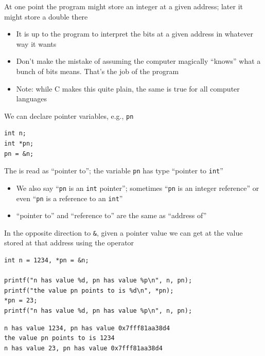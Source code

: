 \documentclass{beamer}
\def\code#1{{\ifmmode\else\large\fi\tt#1}}
\begin{document}
\begin{frame}
At one point the program might store an integer at a given address; later it
might store a double there
\begin{itemize}
\item{It is up to the program to interpret the bits at a given address
  in whatever way it wants}

\item{Don't make the mistake of assuming the computer magically
  ``knows'' what a bunch of bits means.  That's the job of the program}

\item{Note: while C makes this quite plain, the same is true for all
  computer languages}
\end{itemize}
\end{frame}

\begin{frame}[fragile]
We can declare pointer variables, e.g., \code{pn}

\begin{block}{}
\begin{lstlisting}
int n;
int *pn;
pn = &n;
\end{lstlisting}
\end{block}

The \code{*} is read as ``pointer to''; the variable \code{pn} has type
``pointer to \code{int}''
\begin{itemize}
\item{We also say ``\code{pn} is an \code{int} pointer''; sometimes
``\code{pn} is an integer reference'' or even ``\code{pn} is a reference to an
\code{int}''}

\item{``pointer to'' and ``reference to'' are the same as ``address of''}
\end{itemize}
\end{frame}

\begin{frame}[fragile]
In the opposite direction to \code{\&}, given a pointer value we can get at the
value stored at that address using the \code{*} operator
\begin{block}{}
\begin{lstlisting}
int n = 1234, *pn = &n; 

printf("n has value %d, pn has value %p\n", n, pn);
printf("the value pn points to is %d\n", *pn);
*pn = 23;
printf("n has value %d, pn has value %p\n", n, pn);
\end{lstlisting}
\end{block}

\begin{block}{}
\begin{lstlisting}
n has value 1234, pn has value 0x7fff81aa38d4
the value pn points to is 1234
n has value 23, pn has value 0x7fff81aa38d4
\end{lstlisting}
\end{block}
\end{frame}
\end{document}
